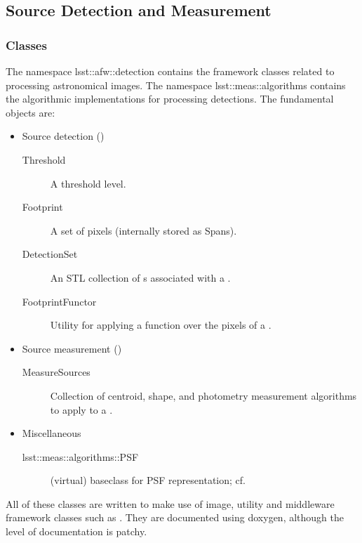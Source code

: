 
\subsection{Source Detection and Measurement}

\subsubsection{Classes}

The namespace lsst::afw::detection contains the framework classes related to 
processing astronomical images. The namespace lsst::meas::algorithms contains
the algorithmic implementations for processing detections.
The fundamental objects are:\begin{itemize}
\item Source detection ()
\begin{description}
    \item[Threshold] A threshold level.
    \item[Footprint] A set of pixels (internally stored as Spans).
    \item[DetectionSet] An STL collection of s associated 
        with a .
    \item[FootprintFunctor] Utility for applying a function over the pixels of
        a .
\end{description}
\item Source measurement ()
\begin{description}
    \item[MeasureSources] Collection of centroid, shape, and photometry 
        measurement algorithms to apply to a .
\end{description}
\item Miscellaneous
\begin{description}
    \item[lsst::meas::algorithms::PSF] (virtual) baseclass for PSF representation; cf. 
    \end{description}
\end{itemize}

All of these classes are written to make use of image, utility and middleware
framework classes such as . They are 
documented using doxygen, although the level of documentation is patchy.

